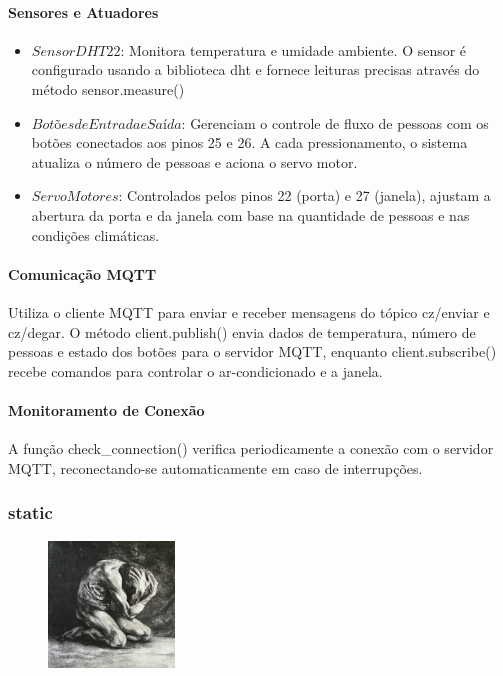 \documentclass[conference, a4paper, 12pt]{IEEEtran}
\begin{document}
\paragraph{Sensores e Atuadores}
\begin{itemize}
\item $Sensor DHT22$: Monitora temperatura e umidade ambiente. O sensor é configurado usando a biblioteca dht e fornece leituras precisas através do método sensor.measure()
\item $Botões de Entrada e Saída$: Gerenciam o controle de fluxo de pessoas com os botões conectados aos pinos 25 e 26. A cada pressionamento, o sistema atualiza o número de pessoas e aciona o servo motor.
\item $Servo Motores$: Controlados pelos pinos 22 (porta) e 27 (janela), ajustam a abertura da porta e da janela com base na quantidade de pessoas e nas condições climáticas.
\end{itemize}
\paragraph{Comunicação MQTT}
Utiliza o cliente MQTT para enviar e receber mensagens do tópico cz/enviar e cz/degar. O método client.publish() envia dados de temperatura, número de pessoas e estado dos botões para o servidor MQTT, enquanto client.subscribe() recebe comandos para controlar o ar-condicionado e a janela.

\paragraph{Monitoramento de Conexão}
A função check\_connection() verifica periodicamente a conexão com o servidor MQTT, reconectando-se automaticamente em caso de interrupções.
\subsubsection{static}
\begin{figure}[h]
  \begin{center}
    \includegraphics[width=0.30\textwidth]{despair.jpg}
  \end{center}
\end{figure}
\end{document}
